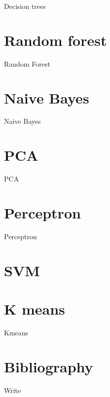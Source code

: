 \documentclass[10pt,a4paper]{article}
\begin{document}
    Decision trees
    
\section{Random forest}
    
    Random Forest
    
\section{Naive Bayes}
    
    Naive Bayes
    
\section{PCA}
    
    PCA
    
\section{Perceptron}
    
    Perceptron
    
\section{SVM}
    
\section{K means}
    
    Kmeans
    
\section{Bibliography}
    Write
    
\end{document}
